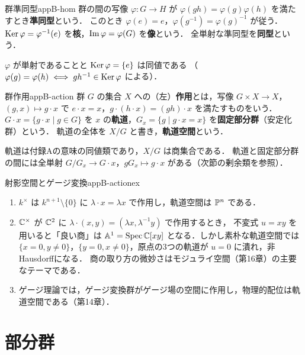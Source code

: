 \begin{mydef}{群準同型}{appB-hom}
群の間の写像 $\varphi\colon G\to H$ が $\varphi(gh)=\varphi(g)\varphi(h)$ を満たすとき\textbf{準同型}という．
このとき $\varphi(e)=e$，$\varphi(g^{-1})=\varphi(g)^{-1}$ が従う．
$\operatorname{Ker}\varphi=\varphi^{-1}(e)$ を\textbf{核}，$\operatorname{Im}\varphi=\varphi(G)$ を\textbf{像}という．
全単射な準同型を\textbf{同型}という．
\end{mydef}

$\varphi$ が単射であることと $\operatorname{Ker}\varphi=\{e\}$ は同値である
（$\varphi(g)=\varphi(h)\iff gh^{-1}\in\operatorname{Ker}\varphi$ による）．

\begin{mydef}{群作用}{appB-action}
群 $G$ の集合 $X$ への（左）\textbf{作用}とは，写像 $G\times X\to X$，$(g,x)\mapsto g\cdot x$ で
$e\cdot x=x$，$g\cdot(h\cdot x)=(gh)\cdot x$ を満たすものをいう．
$G\cdot x=\{g\cdot x\mid g\in G\}$ を $x$ の\textbf{軌道}，$G_x=\{g\mid g\cdot x=x\}$ を\textbf{固定部分群}（安定化群）という．
軌道の全体を $X/G$ と書き，\textbf{軌道空間}という．
\end{mydef}

軌道は付録Aの意味の同値類であり，$X/G$ は商集合である．
軌道と固定部分群の間には全単射 $G/G_x\to G\cdot x$，$gG_x\mapsto g\cdot x$ がある（次節の剰余類を参照）．

\begin{myex}{射影空間とゲージ変換}{appB-actionex}
\begin{enumerate}
\item $k^\times$ は $k^{n+1}\setminus\{0\}$ に $\lambda\cdot x=\lambda x$ で作用し，軌道空間は $\mathbb{P}^n$ である．
\item $\mathbb{C}^\times$ が $\mathbb{C}^2$ に $\lambda\cdot(x,y)=(\lambda x,\lambda^{-1}y)$ で作用するとき，
不変式 $u=xy$ を用いると「良い商」は $\mathbb{A}^1=\operatorname{Spec}\mathbb{C}[xy]$ となる．しかし素朴な軌道空間では
$\{x=0,y\ne0\}$，$\{y=0,x\ne0\}$，原点の3つの軌道が $u=0$ に潰れ，非Hausdorffになる．
商の取り方の微妙さはモジュライ空間（第16章）の主要なテーマである．
\item ゲージ理論では，ゲージ変換群がゲージ場の空間に作用し，物理的配位は軌道空間である（第14章）．
\end{enumerate}
\end{myex}

\section{部分群}

